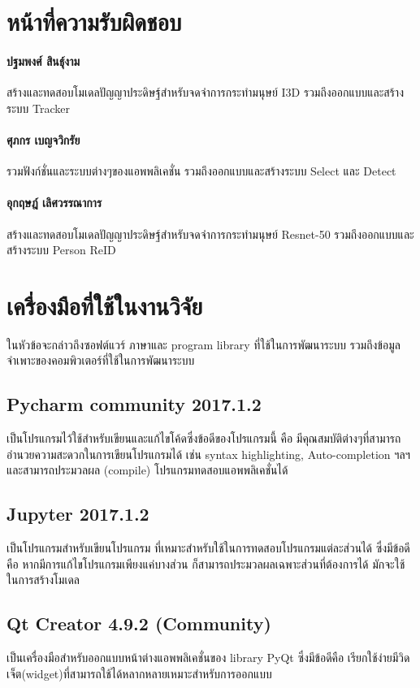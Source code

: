 \section{หน้าที่ความรับผิดชอบ} 
\paragraph*{ปฐมพงศ์ สินธุ์งาม}
สร้างและทดสอบโมเดลปัญญาประดิษฐ์สำหรับจดจำการกระทำมนุษย์ I3D รวมถึงออกแบบและสร้างระบบ Tracker
\paragraph*{ศุภกร เบญจวิกรัย}
รวมฟังก์ชั่นและระบบต่างๆของแอพพลิเคชั่น รวมถึงออกแบบและสร้างระบบ Select และ Detect
\paragraph*{อุกฤษฎ์ เลิศวรรณาการ}
สร้างและทดสอบโมเดลปัญญาประดิษฐ์สำหรับจดจำการกระทำมนุษย์ Resnet-50 รวมถึงออกแบบและสร้างระบบ Person ReID 

\vspace{6mm}
\section{เครื่องมือที่ใช้ในงานวิจัย}
ในหัวข้อจะกล่าวถึงซอฟต์แวร์ ภาษาและ program library ที่ใช้ในการพัฒนาระบบ
รวมถึงข้อมูลจำเพาะของคอมพิวเตอร์ที่ใช้ในการพัฒนาระบบ
\subsection*{Pycharm community 2017.1.2} 
เป็นโปรแกรมไว้ใช้สำหรับเขียนและแก้ไขโค้ดซึ่งข้อดีของโปรแกรมนี้ คือ มีคุณสมบัติต่างๆที่สามารถอำนวยความสะดวกในการเขียนโปรแกรมได้ เช่น 
syntax highlighting, Auto-completion ฯลฯ  
และสามารถประมวลผล (compile) โปรแกรมทดสอบแอพพลิเคชั่นได้

\subsection*{Jupyter 2017.1.2} เป็นโปรแกรมสำหรับเขียนโปรแกรม ที่เหมาะสำหรับใช้ในการทดสอบโปรแกรมแต่ละส่วนได้ ซึ่งมีข้อดีคือ 
หากมีการแก้ไขโปรแกรมเพียงแค่บางส่วน ก็สามารถประมวลผลเฉพาะส่วนที่ต้องการได้
มักจะใช้ในการสร้างโมเดล 

\subsection*{Qt Creator 4.9.2 (Community)}
เป็นเครื่องมือสำหรับออกแบบหน้าต่างแอพพลิเคชั่นของ library PyQt ซึ่งมีข้อดีคือ เรียกใช้ง่ายมีวิดเจ็ต(widget)ที่สามารถใช้ได้หลากหลายเหมาะสำหรับการออกแบบ

